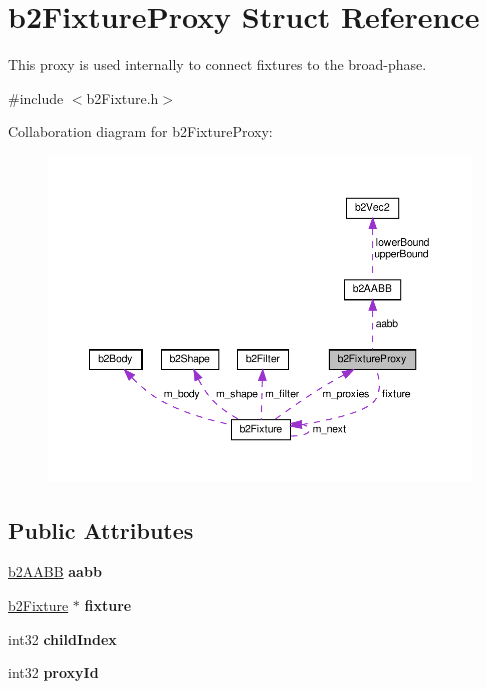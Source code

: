 \hypertarget{structb2FixtureProxy}{}\section{b2\+Fixture\+Proxy Struct Reference}
\label{structb2FixtureProxy}


This proxy is used internally to connect fixtures to the broad-\/phase.  




{\ttfamily \#include $<$b2\+Fixture.\+h$>$}



Collaboration diagram for b2\+Fixture\+Proxy\+:
\nopagebreak
\begin{figure}[H]
\begin{center}
\leavevmode
\includegraphics[width=350pt]{structb2FixtureProxy__coll__graph}
\end{center}
\end{figure}
\subsection*{Public Attributes}
\begin{DoxyCompactItemize}
\item 
\mbox{\label{structb2FixtureProxy_ad8950f61ce28cfa5b676065d4d843da7}} 
\hyperlink{structb2AABB}{b2\+A\+A\+BB} {\bfseries aabb}
\item 
\mbox{\label{structb2FixtureProxy_abd71879311862b7e06526793b71a7e2c}} 
\hyperlink{classb2Fixture}{b2\+Fixture} $\ast$ {\bfseries fixture}
\item 
\mbox{\label{structb2FixtureProxy_a2edb15552cf71f48dacc3608bb134166}} 
int32 {\bfseries child\+Index}
\item 
\mbox{\label{structb2FixtureProxy_aa0ca7e71341368fe6c6913fb39c7283b}} 
int32 {\bfseries proxy\+Id}
\end{DoxyCompactItemize}


